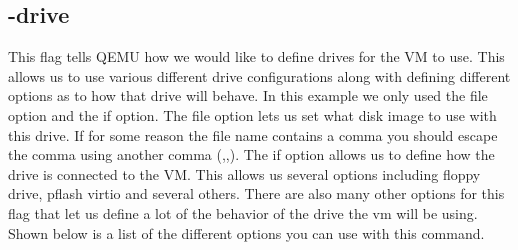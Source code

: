 \documentclass[draftclsnofoot, onecolumn, compsoc, 10pt]{IEEEtran}
\begin{document}
	\subsection{-drive}

		This flag tells QEMU how we would like to define drives for the VM to use. This allows us to use various different drive configurations along with defining different options as to how that drive will behave. In this example we only used the file option and the if option. The file option lets us set what disk image to use with this drive. If for some reason the file name contains a comma you should escape the comma using another comma (,,). The if option allows us to define how the drive is connected to the VM. This allows us several options including floppy drive, pflash virtio and several others. There are also many other options for this flag that let us define a lot of the behavior of the drive the vm will be using. Shown below is a list of the different options you can use with this command.\\
\end{document}
